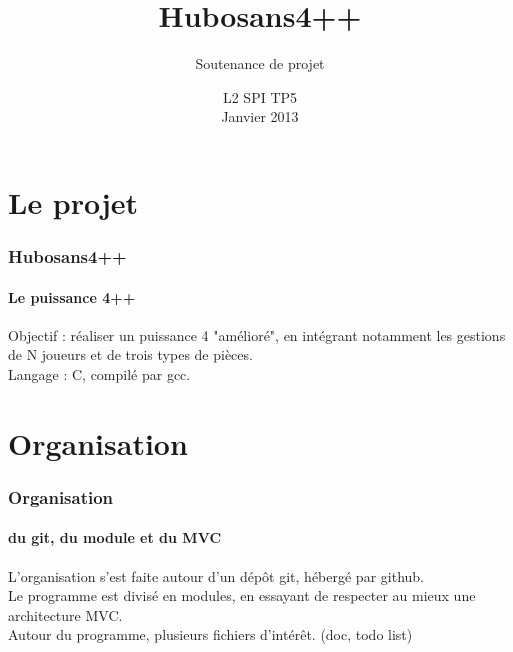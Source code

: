 \documentclass{beamer}
\title{Hubosans4++}
\subtitle{Soutenance de projet}
\author{}
\date{L2 SPI TP5\\ Janvier 2013}
\begin{document}
    \frame{\titlepage}


    \begin{frame}
        \tableofcontents[]
    \end{frame}      



    \section{Le projet}
    \begin{frame}
    \frametitle{Hubosans4++}
    \framesubtitle{Le puissance 4++}
        Objectif : réaliser un puissance 4 "amélioré", 
            en intégrant notamment les gestions de N joueurs 
            et de trois types de pièces. \\     
        \vspace{2cm} %
        Langage : C, compilé par gcc. \\
    \end{frame}


    \section{Organisation}
    \begin{frame}
    \frametitle{Organisation}
    \framesubtitle{du git, du module et du MVC}
        L'organisation s'est faite autour d'un dépôt git, 
            hébergé par github. \\ 
        \vspace{1cm} %
        Le programme est divisé en modules, en essayant 
            de respecter au mieux une architecture MVC. \\
        \vspace{1cm} %
        Autour du programme, plusieurs fichiers d'intérêt.
            (doc, todo list)
    \end{frame}


\end{document}
